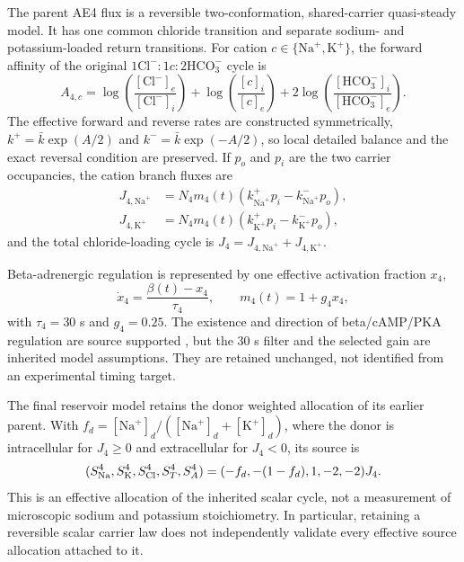 \documentclass[11pt]{article}
\newcommand{\Na}{\mathrm{Na}^{+}}
\newcommand{\K}{\mathrm{K}^{+}}
\newcommand{\Cl}{\mathrm{Cl}^{-}}
\newcommand{\HCO}{\mathrm{HCO}_{3}^{-}}
\begin{document}
The parent AE4 flux is a reversible two-conformation, shared-carrier quasi-steady model. It has one common chloride transition and separate sodium- and potassium-loaded return transitions. For cation $c\in\{\Na,\K\}$, the forward affinity of the original $1\Cl:1c:2\HCO$ cycle is
\begin{equation}
    A_{4,c}=\log\!\left(\frac{[\Cl]_e}{[\Cl]_i}\right)
           +\log\!\left(\frac{[c]_i}{[c]_e}\right)
           +2\log\!\left(\frac{[\HCO]_i}{[\HCO]_e}\right).
    \label{eq:ae4-affinity}
\end{equation}
The effective forward and reverse rates are constructed symmetrically, $k^+=\bar k\exp(A/2)$ and $k^-=\bar k\exp(-A/2)$, so local detailed balance and the exact reversal condition are preserved. If $p_o$ and $p_i$ are the two carrier occupancies, the cation branch fluxes are
\begin{align*}
    J_{4,\Na}&=N_4m_4(t)(k_{\Na}^{+}p_i-k_{\Na}^{-}p_o),\\
    J_{4,\K}&=N_4m_4(t)(k_{\K}^{+}p_i-k_{\K}^{-}p_o),
\end{align*}
and the total chloride-loading cycle is $J_4=J_{4,\Na}+J_{4,\K}$.

Beta-adrenergic regulation is represented by one effective activation fraction $x_4$,
\begin{equation}
    \dot x_4=\frac{\beta(t)-x_4}{\tau_4},
    \qquad m_4(t)=1+g_4x_4,
    \label{eq:ae4-regulation}
\end{equation}
with $\tau_4=30$ s and $g_4=0.25$. The existence and direction of beta/cAMP/PKA regulation are source supported \citep{Pena2021}, but the 30 s filter and the selected gain are inherited model assumptions. They are retained unchanged, not identified from an experimental timing target.

The final reservoir model retains the donor weighted allocation of its earlier parent. With $f_d=[\Na]_d/([\Na]_d+[\K]_d)$, where the donor is intracellular for $J_4\geq0$ and extracellular for $J_4<0$, its source is
\begin{equation}
 (S^4_{\rm Na},S^4_{\rm K},S^4_{\rm Cl},S^4_T,S^4_A)
 =(-f_d,-(1-f_d),1,-2,-2)J_4.
 \label{eq:donor-routing}
\end{equation}
This is an effective allocation of the inherited scalar cycle, not a measurement of microscopic sodium and potassium stoichiometry. In particular, retaining a reversible scalar carrier law does not independently validate every effective source allocation attached to it.
\end{document}
